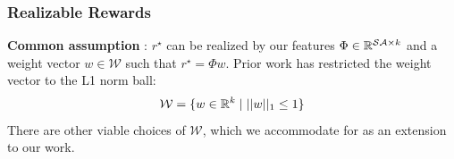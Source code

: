 \documentclass{beamer}
\begin{document}
%


\begin{frame}
	\frametitle{Realizable Rewards}
	\textbf{Common assumption} : $r^\star$ can be realized by our features $\Phi \in \mathbb{R}^{\mathcal{S}\mathcal{A} \times k}$
	and a weight vector $w \in \mathcal{W}$ such that $r^\star = \Phi w$.
	\vfill
	Prior work has restricted the weight vector to the L1 norm ball:
	\[ \mathcal{W} = \lbrace w \in \mathbb{R}^k \mid \lvert \lvert w \rvert \rvert_1 \leq 1 \rbrace \]
	There are other viable choices of $\mathcal{W}$, which we accommodate for as an extension to our work.
\end{frame}
\end{document}

